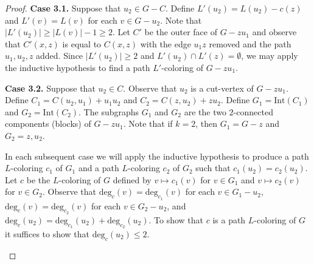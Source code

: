 \documentclass[12pt,letterpaper]{article}
\theoremstyle{plain}
\theoremstyle{definition}
\theoremstyle{break}
\begin{document}
\begin{proof}
\textbf{Case 3.1.}
Suppose that $u_2\in G-C$. Define $L'(u_2)=L(u_2)-c(z)$ and
$L'(v)=L(v)$ for each $v\in G-u_2$. Note that $|L'(u_2)|\ge |L(v)|-1\ge 2$.
Let $C'$ be the outer face of $G-zu_1$
and observe that $C'(x,z)$ is equal to $C(x,z)$ with the edge $u_1z$ removed
and the path $u_1,u_2,z$ added. Since $|L'(u_2)|\ge 2$ and $L'(u_2)\cap
L'(z)=\emptyset$, we may apply the inductive hypothesis
to find a path $L'$-coloring of $G-zu_1$.

\textbf{Case 3.2.}
Suppose that $u_2\in C$. Observe that $u_2$ is a cut-vertex of
$G-zu_1$.
Define $C_1=C(u_2,u_1)+u_1u_2$ and
$C_2=C(z,u_2)+zu_2$. Define $G_1=\text{Int}(C_1)$ and $G_2=\text{Int}(C_2)$.
The subgraphs $G_1$ and $G_2$ are the two $2$-connected components (blocks) of
$G-zu_1$. Note that if $k=2$, then $G_1=G-z$ and $G_2=z,u_2$.

In each subsequent case we will apply the inductive
hypothesis to produce a path $L$-coloring $c_1$ of $G_1$ and a path
$L$-coloring $c_2$ of $G_2$ such that $c_1(u_2)=c_2(u_2)$. Let
$c$ be the $L$-coloring of $G$ defined by $v\mapsto c_1(v)$ for $v\in G_1$
and $v\mapsto c_2(v)$ for $v\in G_2$.
Observe that $\text{deg}_c(v)=\text{deg}_{c_1}(v)$
for each $v\in G_1-u_2$, $\text{deg}_c(v)=\text{deg}_{c_2}(v)$ for each
$v\in G_2-u_2$, and
$\text{deg}_c(u_2)=\text{deg}_{c_1}(u_2)+\text{deg}_{c_2}(u_2)$.
To show that $c$ is a path $L$-coloring of $G$ it suffices to show that
$\text{deg}_{c}(u_2)\le 2$.

\begin{figure}[ht]
\begin{center}
\end{center}
\end{figure}
\end{proof}
\end{document}
